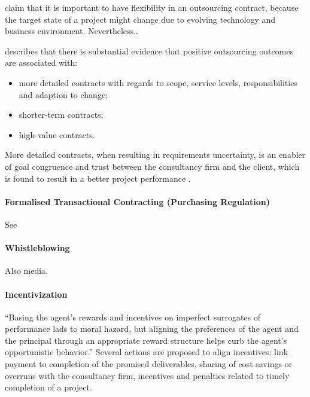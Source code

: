 \documentclass[12pt]{article}
\providecommand{\tightlist}{%
  \setlength{\itemsep}{0pt}\setlength{\parskip}{0pt}}
\begin{document}
\citet{mcfarlan1995} claim that it is important to have flexibility in
an outsourcing contract, because the target state of a project might
change due to evolving technology and business environment.
Nevertheless\ldots{}

\citet[4]{lacity2012} describes that there is substantial evidence that
positive outsourcing outcomes are associated with:

\begin{itemize}
\tightlist
\item
  more detailed contracts with regards to scope, service levels,
  responsibilities and adaption to change;
\item
  shorter-term contracts;
\item
  high-value contracts.
\end{itemize}

More detailed contracts, when resulting in requirements uncertainty, is
an enabler of goal congruence and trust between the consultancy firm and
the client, which is found to result in a better project performance
\citep{liberatore264}.

\hypertarget{formalised-transactional-contracting-purchasing-regulation}{%
\paragraph{Formalised Transactional Contracting (Purchasing
Regulation)}\label{formalised-transactional-contracting-purchasing-regulation}}

See \citet[4-5]{sturdy2021}

\hypertarget{whistleblowing}{%
\paragraph{Whistleblowing}\label{whistleblowing}}

Also media.

\hypertarget{incentivization}{%
\paragraph{Incentivization}\label{incentivization}}

``Basing the agent's rewards and incentives on imperfect surrogates of
performance lads to moral hazard, but aligning the preferences of the
agent and the principal through an appropriate reward structure helps
curb the agent's opportunistic behavior.'' \citep[ 13-15]{basu2011}
Several actions are proposed to align incentives: link payment to
completion of the promised deliverables, sharing of cost savings or
overruns with the consultancy firm, incentives and penalties related to
timely completion of a project.
\end{document}
